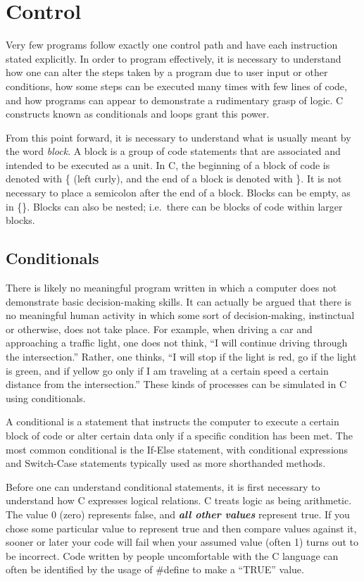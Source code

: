 \section{Control}
Very few programs follow exactly one control path and have each instruction
stated explicitly. In order to program effectively, it is necessary to
understand how one can alter the steps taken by a program due to user input or
other conditions, how some steps can be executed many times with few lines of
code, and how programs can appear to demonstrate a rudimentary grasp of logic.
C constructs known as conditionals and loops grant this power.

From this point forward, it is necessary to understand what is usually meant by
the word \emph{block}. A block is a group of code statements that are
associated and intended to be executed as a unit. In C, the beginning of a
block of code is denoted with \{ (left curly), and the end of a block is
denoted with \}. It is not necessary to place a semicolon after the end of a
block. Blocks can be empty, as in \{\}. Blocks can also be nested; i.e.\ there
can be blocks of code within larger blocks.

\subsection{Conditionals}
There is likely no meaningful program written in which a computer does not
demonstrate basic decision-making skills. It can actually be argued that there
is no meaningful human activity in which some sort of decision-making,
instinctual or otherwise, does not take place. For example, when driving a car
and approaching a traffic light, one does not think, ``I will continue driving
through the intersection.'' Rather, one thinks, ``I will stop if the light is
red, go if the light is green, and if yellow go only if I am traveling at a
certain speed a certain distance from the intersection.'' These kinds of
processes can be simulated in C using conditionals.

A conditional is a statement that instructs the computer to execute a certain
block of code or alter certain data only if a specific condition has been met.
The most common conditional is the If-Else statement, with conditional
expressions and Switch-Case statements typically used as more shorthanded
methods.

Before one can understand conditional statements, it is first necessary to
understand how C expresses logical relations. C treats logic as being
arithmetic. The value 0 (zero) represents false, and \textbf{\emph{all other
values}} represent true. If you chose some particular value to represent true
and then compare values against it, sooner or later your code will fail when
your assumed value (often 1) turns out to be incorrect. Code written by people
uncomfortable with the C language can often be identified by the usage of
\#define to make a ``TRUE'' value.

